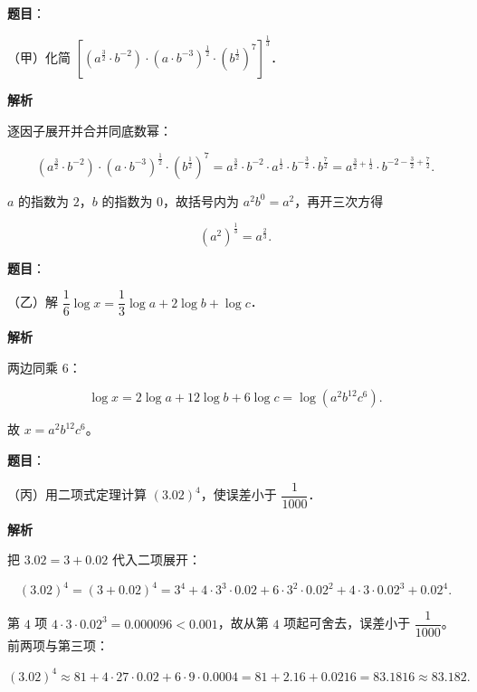 
\begin{answer}

\textbf{题目}：

（甲）化简 $\left[\left(a^{\frac32}\cdot b^{-2}\right)\cdot\left(a\cdot b^{-3}\right)^{\frac12}\cdot\left(b^{\frac12}\right)^7\right]^{\frac13}$．

\textbf{解析}

逐因子展开并合并同底数幂：

\nopagebreak[4]
\[
\left(a^{\frac32}\cdot b^{-2}\right)\cdot\left(a\cdot b^{-3}\right)^{\frac12}\cdot\left(b^{\frac12}\right)^7
=a^{\frac32}\cdot b^{-2}\cdot a^{\frac12}\cdot b^{-\frac32}\cdot b^{\frac72}
=a^{\frac32+\frac12}\cdot b^{-2-\frac32+\frac72}.
\]

$a$ 的指数为 $2$，$b$ 的指数为 $0$，故括号内为 $a^2b^0=a^2$，再开三次方得

\nopagebreak[4]
\[
\left(a^2\right)^{\frac13}=a^{\frac23}.
\]


\end{answer}
\begin{answer}

\textbf{题目}：

（乙）解 $\dfrac16\log x=\dfrac13\log a+2\log b+\log c$．

\textbf{解析}

两边同乘 $6$：

\nopagebreak[4]
\[
\log x=2\log a+12\log b+6\log c=\log\left(a^2b^{12}c^6\right).
\]

故 $x=a^2b^{12}c^6$。


\end{answer}
\begin{answer}

\textbf{题目}：

（丙）用二项式定理计算 $(3.02)^4$，使误差小于 $\dfrac1{1000}$．

\textbf{解析}

把 $3.02=3+0.02$ 代入二项展开：

\nopagebreak[4]
\[
(3.02)^4=(3+0.02)^4=3^4+4\cdot3^3\cdot0.02+6\cdot3^2\cdot0.02^2+4\cdot3\cdot0.02^3+0.02^4.
\]

第 $4$ 项 $4\cdot3\cdot0.02^3=0.000096<0.001$，故从第 $4$ 项起可舍去，误差小于 $\dfrac1{1000}$。前两项与第三项：

\nopagebreak[4]
\[
(3.02)^4\approx81+4\cdot27\cdot0.02+6\cdot9\cdot0.0004=81+2.16+0.0216=83.1816\approx83.182.
\]


\end{answer}
